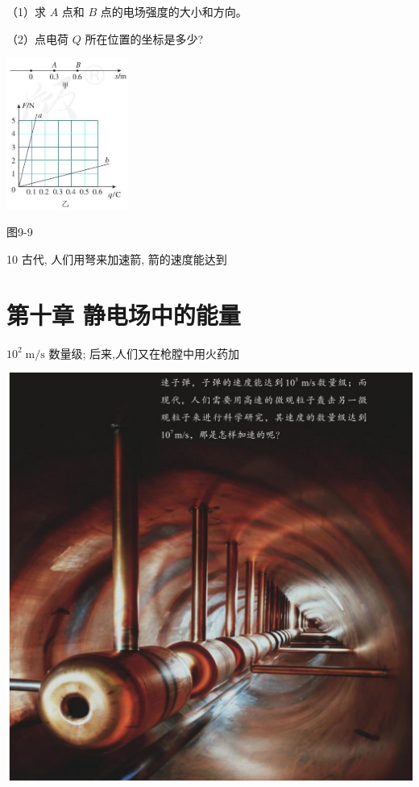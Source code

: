 \documentclass[10pt]{article}
\begin{document}
（1）求 \(A\) 点和 \(B\) 点的电场强度的大小和方向。

（2）点电荷 \(Q\) 所在位置的坐标是多少?

\begin{center}
\includegraphics[max width=0.3\textwidth]{images/01911d5f-8e38-70c0-b5b8-2b399bd115b6_29_882815.jpg}
\end{center}

图9-9

10 古代, 人们用弩来加速箭, 箭的速度能达到

\section*{第十章 静电场中的能量}

\({10}^{2}\mathrm{\;m}/\mathrm{s}\) 数量级; 后来,人们又在枪膛中用火药加

\begin{center}
\includegraphics[max width=1.0\textwidth]{images/01911d5f-8e38-70c0-b5b8-2b399bd115b6_30_244226.jpg}
\end{center}
\end{document}
